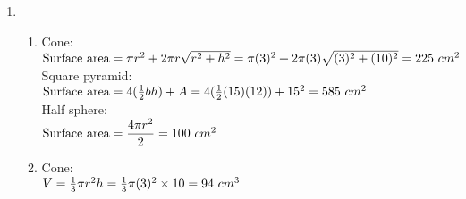 \begin{eocsolutions}{}
{\begin{enumerate}[itemsep=5pt, label=\textbf{\arabic*}. ]
\begin{enumerate}[itemsep=5pt, label=\textbf{(\alph*)} ]
Triangular prism:  \\
$\mbox{Surface area} = 2(\frac{1}{2}b \times h) + 2(H \times S) + (H \times b)\\
= 2(\frac{9}{2}(8)(3)) + 18(20 \times 5 ) + 9(20 \times 8)\\
= 3456 ~cm^{2}$\\

Rectangular prism:\\
$\mbox{ Surface area} = 2[9(L \times b) + 9(b \times h) + 9(L \times h)] \\
= 2[9(5 \times 4) + 9(4 \times 2) + 9(5 \times 2)] \\
= 684 ~cm^{2}$

\item Cylinder: \\
$\mbox{Volume} = \pi 3r^2 3h \\
\pi (3(4))^2(3(10))\\
= 13571,9 ~cm^{3}$ \\

Triangular prism:  \\
$\mbox{Volume} = \frac{1}{2} \times h \times b \times H\\
= \frac{27}{2}(3)(8)(20)\\
= 6480 ~cm^{3}$ \\

Rectangular prism:
$\mbox{Volume} = 27(L \times b \times h)\\
= 27(5 \times 4 \times 2) \\
= 1080 ~ cm^{3}$ 
      \end{enumerate}
\item \begin{enumerate}[itemsep=5pt, label=\textbf{(\alph*)} ]
\item Cone:\\
$\mbox{Surface area} = \pi r^2 + 2 \pi r \sqrt{r^2 + h^2} \\
= \pi (3)^2 + 2\pi (3) \sqrt{(3)^2 + (10)^2}\\
= 225 ~cm^{2}$\\

Square pyramid:\\
$\mbox{Surface area} = 4(\frac{1}{2}bh)+A\\
= 4(\frac{1}{2} (15)(12))+15^2 \\
= 585 ~cm^{2}$\\

Half sphere:\\
$\mbox{Surface area} = \dfrac{4 \pi r^2}{2}\\
= 100 ~cm^{2}$
\item Cone:\\
$V = \frac{1}{3} \pi r^{2} h \\
= \frac{1}{3} \pi (3)^2 \times 10 \\
= 94 ~cm^{3}$\\


\end{enumerate}
\end{enumerate}}
\end{eocsolutions}
